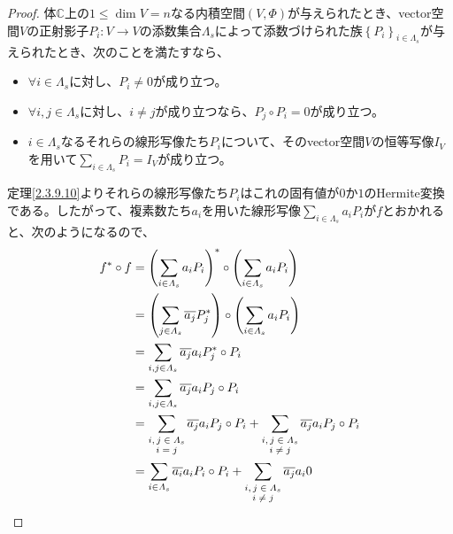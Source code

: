 \documentclass[dvipdfmx]{jsarticle}
\begin{document}
\begin{proof}
体$\mathbb{C}$上の$1 \leq \dim V = n$なる内積空間$(V,\varPhi)$が与えられたとき、vector空間$V$の正射影子$P_{i}:V \rightarrow V$の添数集合$\varLambda_{s}$によって添数づけられた族$\left\{ P_{i} \right\}_{i \in \varLambda_{s}}$が与えられたとき、次のことを満たすなら、
\begin{itemize}
\item
  $\forall i \in \varLambda_{s}$に対し、$P_{i} \neq 0$が成り立つ。
\item
  $\forall i,j \in \varLambda_{s}$に対し、$i \neq j$が成り立つなら、$P_{j} \circ P_{i} = 0$が成り立つ。
\item
  $i \in \varLambda_{s}$なるそれらの線形写像たち$P_{i}$について、そのvector空間$V$の恒等写像$I_{V}$を用いて$\sum_{i \in \varLambda_{s}} P_{i} = I_{V}$が成り立つ。
\end{itemize}
定理\ref{2.3.9.10}よりそれらの線形写像たち$P_{i}$はこれの固有値が$0$か$1$のHermite変換である。したがって、複素数たち$a_{i}$を用いた線形写像$\sum_{i \in \varLambda_{s}} {a_{i}P_{i}}$が$f$とおかれると、次のようになるので、
\begin{align*}
f^{*} \circ f &= \left( \sum_{i \in \varLambda_{s}} {a_{i}P_{i}} \right)^{*} \circ \left( \sum_{i \in \varLambda_{s}} {a_{i}P_{i}} \right)\\
&= \left( \sum_{j \in \varLambda_{s}} {\overline{a_{j}}P_{j}^{*}} \right) \circ \left( \sum_{i \in \varLambda_{s}} {a_{i}P_{i}} \right)\\
&= \sum_{i,j \in \varLambda_{s}} {\overline{a_{j}}a_{i}P_{j}^{*} \circ P_{i}}\\
&= \sum_{i,j \in \varLambda_{s}} {\overline{a_{j}}a_{i}P_{j} \circ P_{i}}\\
&= \sum_{\scriptsize \begin{matrix} i,j \in \varLambda_{s} \\i = j \\\end{matrix}} {\overline{a_{j}}a_{i}P_{j} \circ P_{i}} + \sum_{\scriptsize \begin{matrix} i,j \in \varLambda_{s} \\i \neq j \\\end{matrix}} {\overline{a_{j}}a_{i}P_{j} \circ P_{i}}\\
&= \sum_{i \in \varLambda_{s} } {\overline{a_{i}}a_{i}P_{i} \circ P_{i}} + \sum_{\scriptsize \begin{matrix} i,j \in \varLambda_{s} \\i \neq j \\\end{matrix}} {\overline{a_{j}}a_{i}0}\\

\end{align*}
\end{proof}
\end{document}
